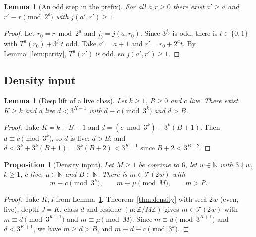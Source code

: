 \documentclass[11pt,reqno,oneside]{amsart}
\theoremstyle{plain}
\newtheorem{proposition}[theorem]{Proposition}
\newtheorem{lemma}[theorem]{Lemma}
\theoremstyle{definition}
\numberwithin{equation}{section}
\newcommand{\N}{\mathbb{N}}
\newcommand{\Z}{\mathbb{Z}}
\newcommand{\ZM}{\Z/M\Z}
\newcommand{\Tr}{\mathcal{T}}
\begin{document}
\begin{lemma}[An odd step in the prefix]\label{lem:normalize}
For all $a,r\ge0$ there exist $a'\ge a$ and $r'\equiv r\pmod{2^a}$ with $j(a',r')\ge1$.
\end{lemma}
\begin{proof}
Let $r_0=r\bmod 2^a$ and $j_0=j(a,r_0)$. Since $3^{j_0}$ is odd, there is $t\in\{0,1\}$ with $T^a(r_0)+3^{j_0}t$ odd. Take $a'=a+1$ and $r'=r_0+2^at$. By Lemma~\ref{lem:parity}, $T^a(r')$ is odd, so $j(a',r')\ge1$.
\end{proof}

\subsection*{Density input}
\begin{lemma}[Deep lift of a live class]\label{lem:lift_class}
Let $k\ge1$, $B\ge0$ and $c$ live. There exist $K\ge k$ and a live $d<3^{K+1}$ with $d\equiv c\pmod{3^k}$ and $d>B$.
\end{lemma}
\begin{proof}
Take $K=k+B+1$ and $d=(c\bmod3^k)+3^k(B+1)$. Then $d\equiv c\pmod{3^k}$, so $d$ is live; $d>B$; and $d<3^k+3^k(B+1)=3^k(B+2)<3^{K+1}$ since $B+2<3^{B+2}$.
\end{proof}

\begin{proposition}[Density input]\label{prop:density_input}
Let $M\ge1$ be coprime to $6$, let $w\in\N$ with $3\nmid w$, $k\ge1$, $c$ live, $\mu\in\N$ and $B\in\N$. There is $m\in\Tr(2w)$ with
\[
m\equiv c\pmod{3^k},\qquad m\equiv\mu\pmod M,\qquad m>B .
\]
\end{proposition}
\begin{proof}
Take $K,d$ from Lemma~\ref{lem:lift_class}. Theorem~\ref{thm:density} with seed $2w$ (even, live), depth $J=K$, class $d$ and residue $(\mu:\ZM)$ gives $m\in\Tr(2w)$ with $m\equiv d\pmod{3^{K+1}}$ and $m\equiv\mu\pmod M$. Since $m\equiv d\pmod{3^{K+1}}$ and $d<3^{K+1}$, we have $m\ge d>B$, and $m\equiv d\equiv c\pmod{3^k}$.
\end{proof}
\end{document}
